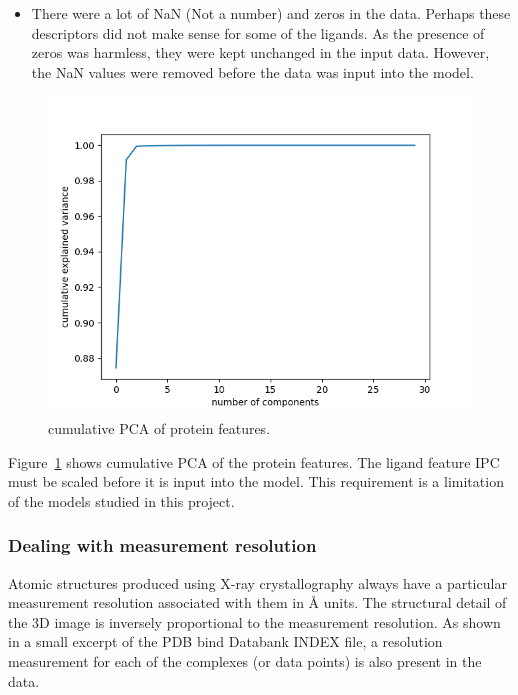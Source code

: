 \documentclass[11pt]{article}
\begin{document}
\begin{itemize}
\item There were a lot of NaN (Not a number) and zeros in the data.  Perhaps these descriptors did not make sense for some of the ligands. As the presence of zeros was harmless, they were kept unchanged in the input data. However, the NaN values were removed before the data was input into the model. 
\end{itemize}

\begin{figure}[htb]
  \centering
    \includegraphics[scale=0.7]{images/pcaproteinanalysis}
    \caption{cumulative PCA of protein features.}
    \label{fig:pcaproteinanalysis}
\end{figure}

Figure~\ref{fig:pcaproteinanalysis} shows cumulative PCA of the protein features. The ligand feature IPC must be scaled before it is input into the model. This requirement is a limitation of the models studied in this project.

\subsubsection{Dealing with measurement resolution}
Atomic structures produced using X-ray crystallography always have a particular measurement resolution associated with them in \si{\angstrom} units. The structural detail of the 3D image is inversely proportional to the measurement resolution.
As shown in a small excerpt of the PDB bind Databank INDEX file, a resolution measurement for each of the complexes (or data points) is also present in the data.
\end{document}
